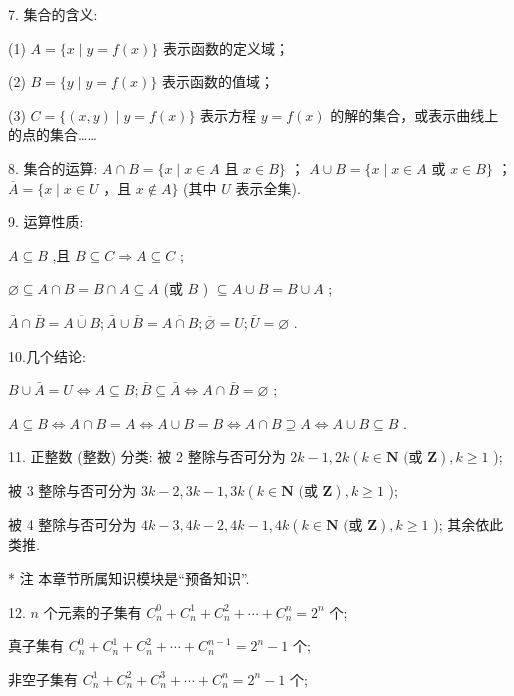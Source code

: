 7. 集合的含义:

(1) $A = \{ x \mid  y = f\left( x\right) \}$ 表示函数的定义域；

(2) $B = \{ y \mid  y = f\left( x\right) \}$ 表示函数的值域；

(3) $C = \{ \left( {x,y}\right)  \mid  y = f\left( x\right) \}$ 表示方程 $y = f\left( x\right)$ 的解的集合，或表示曲线上的点的集合……

8. 集合的运算: $A \cap  B = \{ x \mid  x \in  A$ 且 $x \in  B\}$ ； $A \cup  B = \{ x \mid  x \in  A$ 或 $x \in  B\}$ ； $\overline{A} = \{ x \mid  x \in  U$ ，且 $x \notin  A\}$ (其中 $U$ 表示全集).

9. 运算性质:

$A \subseteq  B$ ,且 $B \subseteq  C \Rightarrow  A \subseteq  C$ ;

$\varnothing  \subseteq  A \cap  B = B \cap  A \subseteq  A$ (或 $B$ ) $\subseteq  A \cup  B = B \cup  A$ ;

$\bar{A} \cap  \bar{B} = \overline{A \cup  B};\bar{A} \cup  \bar{B} = \overline{A \cap  B};\overline{\varnothing } = U;\bar{U} = \varnothing$ .

10.几个结论:

$B \cup  \bar{A} = U \Leftrightarrow  A \subseteq  B;\bar{B} \subseteq  \bar{A} \Leftrightarrow  A \cap  \bar{B} = \varnothing$ ;

$A \subseteq  B \Leftrightarrow  A \cap  B = A \Leftrightarrow  A \cup  B = B \Leftrightarrow  A \cap  B \supseteq  A \Leftrightarrow  A \cup  B \subseteq  B$ .

11. 正整数 (整数) 分类: 被 2 整除与否可分为 ${2k} - 1,{2k}\left( {k \in  \mathbf{N}\text{ (或 }\mathbf{Z}}\right) ,k \geq  1$ );

被 3 整除与否可分为 ${3k} - 2,{3k} - 1,{3k}\left( {k \in  \mathbf{N}\text{ (或 }\mathbf{Z}}\right) ,k \geq  1$ );

被 4 整除与否可分为 ${4k} - 3,{4k} - 2,{4k} - 1,{4k}\left( {k \in  \mathbf{N}\text{ (或 }\mathbf{Z}}\right) ,k \geq  1$ ); 其余依此类推.



* 注 本章节所属知识模块是“预备知识”.



12. $n$ 个元素的子集有 ${{C}}_{n}^{0} + {{C}}_{n}^{1} + {{C}}_{n}^{2} + \cdots  + {{C}}_{n}^{n} = {2}^{n}$ 个;

真子集有 ${{C}}_{n}^{0} + {{C}}_{n}^{1} + {{C}}_{n}^{2} + \cdots  + {{C}}_{n}^{n - 1} = {2}^{n} - 1$ 个;

非空子集有 ${{C}}_{n}^{1} + {{C}}_{n}^{2} + {{C}}_{n}^{3} + \cdots  + {{C}}_{n}^{n} = {2}^{n} - 1$ 个;


